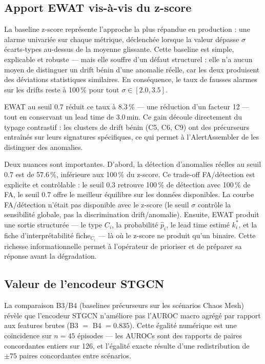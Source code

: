 \subsection{Apport EWAT vis-à-vis du z-score}
\label{sec:ewat_vs_zscore}

La baseline z-score représente l'approche la plus répandue en production : une alarme
univariée sur chaque métrique, déclenchée lorsque la valeur dépasse $\sigma$ écarts-types
au-dessus de la moyenne glissante. Cette baseline est simple, explicable et robuste ---
mais elle souffre d'un défaut structurel : elle n'a aucun moyen de distinguer un drift
bénin d'une anomalie réelle, car les deux produisent des déviations statistiques similaires.
En conséquence, le taux de fausses alarmes sur les drifts reste à 100\,\% pour tout
$\sigma \in [2.0, 3.5]$.

EWAT au seuil 0.7 réduit ce taux à 8.3\,\% --- une réduction d'un facteur 12 --- tout
en conservant un lead time de 3.0\,min. Ce gain découle directement du typage contrastif :
les clusters de drift bénin (C5, C6, C9) ont des précurseurs entraînés sur leurs
signatures spécifiques, ce qui permet à l'AlertAssembler de les distinguer des anomalies.

Deux nuances sont importantes. D'abord, la détection d'anomalies réelles au seuil 0.7
est de 57.6\,\%, inférieure aux 100\,\% du z-score. Ce trade-off FA/détection est explicite
et contrôlable : le seuil 0.3 retrouve 100\,\% de détection avec 100\,\% de FA, le seuil 0.7
offre le meilleur équilibre sur les données disponibles. La courbe FA/détection n'était pas
disponible avec le z-score (le seuil $\sigma$ contrôle la sensibilité globale, pas la
discrimination drift/anomalie).
Ensuite, EWAT produit une sortie structurée --- le type $C_i$, la probabilité $\hat{p}_i$,
le lead time estimé $k^*_i$, et la fiche d'interprétabilité $\text{fiche}_{C_i}$ ---
là où le z-score ne produit qu'un binaire. Cette richesse informationnelle permet à
l'opérateur de prioriser et de préparer sa réponse avant la dégradation.

\subsection{Valeur de l'encodeur STGCN}
\label{sec:stgcn_value}

La comparaison B3/B4 (baselines précurseurs sur les scénarios Chaos Mesh) révèle que
l'encodeur STGCN n'améliore pas l'AUROC macro agrégé par rapport aux features brutes
(B3 $=$ B4 $= 0.835$). Cette égalité numérique est une coïncidence sur $n = 45$ épisodes
--- les AUROCs sont des rapports de paires concordantes entiers sur 126, et l'égalité
exacte résulte d'une redistribution de $\pm 75$ paires concordantes entre scénarios.

